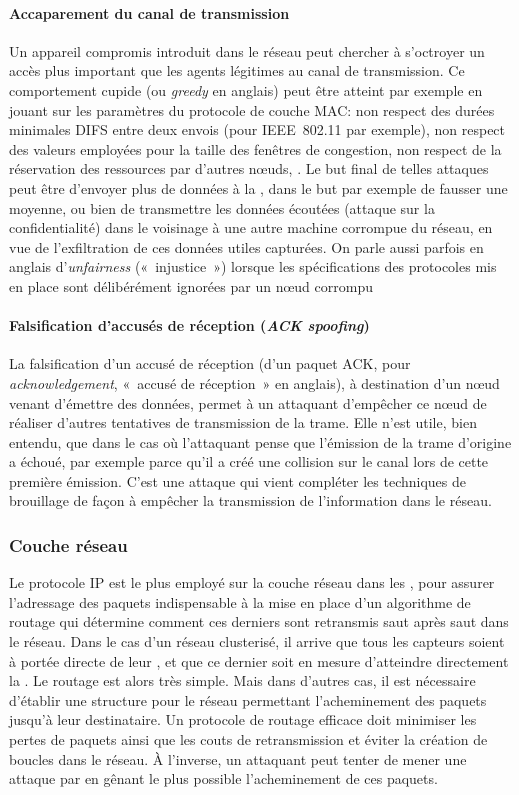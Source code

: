         \paragraph{Accaparement du canal de transmission}
Un appareil compromis introduit dans le réseau peut chercher à s'octroyer un accès plus important que les agents légitimes au canal de transmission.
Ce comportement cupide (ou \textit{greedy} en anglais) peut être atteint par exemple en jouant sur les paramètres du protocole de couche MAC: non respect des durées minimales DIFS entre deux envois (pour IEEE~802.11 par exemple), non respect des valeurs employées pour la taille des fenêtres de congestion, non respect de la réservation des ressources par d'autres nœuds, \etc.
Le but final de telles attaques peut être d'envoyer plus de données à la \sdb, dans le but par exemple de fausser une moyenne, ou bien de transmettre les données écoutées (attaque sur la confidentialité) dans le voisinage à une autre machine corrompue du réseau, en vue de l'exfiltration de ces données utiles capturées.
On parle aussi parfois en anglais d'\textit{unfairness} (« injustice ») lorsque les spécifications des protocoles mis en place sont délibérément ignorées par un nœud corrompu

\paragraph{Falsification d'accusés de réception (\textit{ACK spoofing})}
La falsification d'un accusé de réception (d'un paquet ACK, pour \textit{acknowledgement}, « accusé de réception » en anglais), à destination d'un nœud venant d'émettre des données, permet à un attaquant d'empêcher ce nœud de réaliser d'autres tentatives de transmission de la trame.
Elle n'est utile, bien entendu, que dans le cas où l'attaquant pense que l'émission de la trame d'origine a échoué, par exemple parce qu'il a créé une collision sur le canal lors de cette première émission.
C'est une attaque qui vient compléter les techniques de brouillage de façon à empêcher la transmission de l'information dans le réseau.

    \subsubsection{Couche réseau}
Le protocole IP est le plus employé sur la couche réseau dans les \rcs, pour assurer l'adressage des paquets indispensable à la mise en place d'un algorithme de routage qui détermine comment ces derniers sont retransmis saut après saut dans le réseau.
Dans le cas d'un réseau clusterisé, il arrive que tous les capteurs soient à portée directe de leur \ch, et que ce dernier soit en mesure d'atteindre directement la \sdb.
Le routage est alors très simple.
Mais dans d'autres cas, il est nécessaire d'établir une structure pour le réseau permettant l'acheminement des paquets jusqu'à leur destinataire.
Un protocole de routage efficace doit minimiser les pertes de paquets ainsi que les couts de retransmission et éviter la création de boucles dans le réseau.
À l'inverse, un attaquant peut tenter de mener une attaque par \dds en gênant le plus possible l'acheminement de ces paquets.

